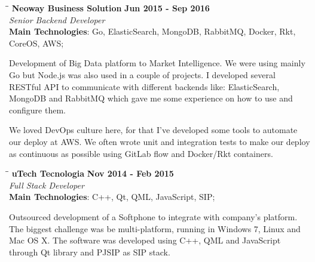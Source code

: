 \documentclass[margin]{res}
\begin{document}
\begin{resume}
\vspace{-0.1in}
    \begin{tabbing}
    \hspace{2.3in}\= \hspace{1.7in}\= \kill %
    \textbf{Neoway Business Solution}    \>\>\textbf{Jun 2015 - Sep 2016}\\
    \textit{Senior Backend Developer}\\
    \textbf{Main Technologies}: Go, ElasticSearch, MongoDB, RabbitMQ, Docker, Rkt,\\CoreOS, AWS;
    \end{tabbing}\vspace{-20pt}      %
    \vspace{2mm}
Development of Big Data platform to Market Intelligence. We were using mainly Go but Node.js was also used in a couple of projects. I developed several RESTful API to communicate with different backends like: ElasticSearch, MongoDB and RabbitMQ which gave me some experience on how to use and configure them.

We loved DevOps culture here, for that I've developed some tools to automate our deploy at AWS. We often wrote unit and integration tests to make our deploy as continuous as possible using GitLab flow and Docker/Rkt containers.

\vspace{-0.1in}
    \begin{tabbing}
    \hspace{2.3in}\= \hspace{1.7in}\= \kill
    \textbf{uTech Tecnologia}    \>\>\textbf{Nov 2014 - Feb 2015}\\
    \textit{Full Stack Developer}\\
    \textbf{Main Technologies}: C++, Qt, QML, JavaScript, SIP;
    \end{tabbing}\vspace{-20pt}
    \vspace{2mm}
Outsourced development of a Softphone to integrate with company’s platform. The biggest challenge was be multi-platform, running in Windows 7, Linux and Mac OS X. The software was developed using C++, QML and JavaScript through Qt library and PJSIP as SIP stack.


\end{resume}
\end{document}
